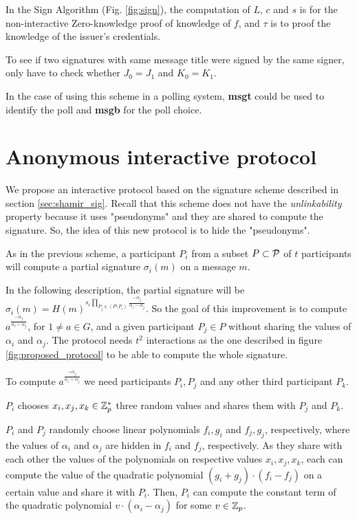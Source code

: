 In the Sign Algorithm (Fig. \ref{fig:sign}), the computation of $L$, $c$ and $s$ is for the non-interactive Zero-knowledge proof of knowledge of $f$, and $\tau$ is to proof the knowledge of the issuer's credentials.

To see if two signatures with same message title were signed by the same signer, only have to check whether $J_0 = J_1$ and $K_0 = K_1$.

In the case of using this scheme in a polling system, \textbf{msgt} could be used to identify the poll and \textbf{msgb} for the poll choice.

\section{Anonymous interactive protocol}

We propose an interactive protocol based on the signature scheme described in section \ref{sec:shamir_sig}. Recall that this scheme does not have the \textit{unlinkability} property because it uses "pseudonyms" and they are shared to compute the signature. So, the idea of this new protocol is to hide the "pseudonyms".

As in the previous scheme, a participant $P_i$ from a subset $P \subset {\mathcal P}$ of $t$ participants will compute a partial signature $\sigma_i (m)$ on a message $m$.

In the following description, the partial signature will be $\sigma_i (m) = H(m)^{s_i \prod_{P_j \in (P \setminus P_i)} \frac{-\alpha_j}{\alpha_i - \alpha_j}}$. So the goal of this improvement is to compute $a^\frac{-\alpha_j}{\alpha_i - \alpha_j}$, for $1 \neq a \in G$, and a given participant $P_j \in P$ without sharing the values of $\alpha_i$ and $\alpha_j$. The protocol needs $t^2$ interactions as the one described in figure \ref{fig:proposed_protocol} to be able to compute the whole signature.

To compute $a^\frac{-\alpha_j}{\alpha_i - \alpha_j}$ we need participants $P_i,P_j$ and any other third participant $P_k$.

$P_i$ chooses $x_i, x_j, x_k \in {\mathbb Z}^*_p$ three random values and shares them with $P_j$ and $P_k$.

$P_i$ and $P_j$ randomly choose linear polynomials $f_i, g_i$ and $f_j, g_j$, respectively, where the values of $\alpha_i$ and $\alpha_j$ are hidden in $f_i$ and $f_j$, respectively. As they share with each other the values of the polynomials on respective values $x_i, x_j, x_k$, each can compute the value of the quadratic polynomial $(g_i+g_j) \cdot (f_i - f_j)$ on a certain value and share it with $P_i$. Then, $P_i$ can compute the constant term of the quadratic polynomial $v \cdot (\alpha_i - \alpha_j)$ for some $v \in {\mathbb Z}_p$.

